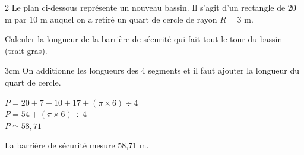 \documentclass[a4paper]{book}
\begin{document}
{\newpage


    \begin{exerciceNote}{2}
        Le plan ci-dessous représente un nouveau bassin. Il s'agit d'un rectangle de $20$ m par $10$ m auquel on a retiré un quart de cercle de rayon $R = 3$ m.

        \begin{center}
        \end{center}
        
        Calculer la longueur de la barrière de sécurité qui fait tout le tour du bassin (trait gras). 

        \begin{ZoneReponse}{3cm}
            On additionne les longueurs des 4 segments et il faut ajouter la longueur du quart de cercle.
            
            $P=20+7+10+17+(\pi\times6)\div4$\\
            $P=54+(\pi\times6)\div4$\\
            $P\simeq58,71$

            La barrière de sécurité mesure 58,71 m.
        \end{ZoneReponse}
    \end{exerciceNote}

}
\end{document}
